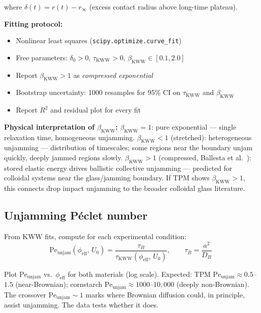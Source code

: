 \documentclass[11pt,letterpaper]{article}
\newcommand{\phieff}{\phi_{\mathrm{eff}}}
\newcommand{\taukww}{\tau_{\mathrm{KWW}}}
\newcommand{\taub}{\tau_{B}}
\newcommand{\peunj}{\mathrm{Pe}_{\mathrm{unjam}}}
\newcommand{\bkww}{\beta_{\mathrm{KWW}}}
\newcommand{\DB}{D_B}
\begin{document}
where $\delta(t) = r(t) - r_\infty$ (excess contact radius above long-time plateau).

\noindent\textbf{Fitting protocol:}
\begin{itemize}[noitemsep,topsep=3pt]
  \item Nonlinear least squares (\texttt{scipy.optimize.curve\_fit})
  \item Free parameters: $\delta_0 > 0$, $\taukww > 0$, $\bkww \in [0.1, 2.0]$
  \item Report $\bkww > 1$ as \emph{compressed exponential} \cite{Ballesta2008}
  \item Bootstrap uncertainty: 1000 resamples for 95\% CI on $\taukww$ and $\bkww$
  \item Report $R^2$ and residual plot for every fit
\end{itemize}

\begin{intuitionbox}
\textbf{Physical interpretation of $\bkww$:}
$\bkww = 1$: pure exponential --- single relaxation time, homogeneous unjamming.
$\bkww < 1$ (stretched): heterogeneous unjamming --- distribution of timescales;
some regions near the boundary unjam quickly, deeply jammed regions slowly.
$\bkww > 1$ (compressed, Ballesta et al.\ \cite{Ballesta2008}): stored elastic
energy drives ballistic collective unjamming --- predicted for colloidal systems
near the glass/jamming boundary. If TPM shows $\bkww > 1$, this connects
drop impact unjamming to the broader colloidal glass literature.
\end{intuitionbox}

\subsection{Unjamming Péclet number}

From KWW fits, compute for each experimental condition:
\begin{equation}
  \peunj(\phieff,\, U_0) = \frac{\taub}{\taukww(\phieff,\, U_0)},
  \qquad \taub = \frac{a^2}{\DB}
  \label{eq:Pe_unjam_exp}
\end{equation}

Plot $\peunj$ vs.\ $\phieff$ for both materials (log scale).
Expected: TPM $\peunj \approx 0.5$--$1.5$ (near-Brownian);
cornstarch $\peunj \approx 1000$--$10{,}000$ (deeply non-Brownian).
The crossover $\peunj \sim 1$ marks where Brownian diffusion could, in
principle, assist unjamming. The data tests whether it does.

\end{document}
